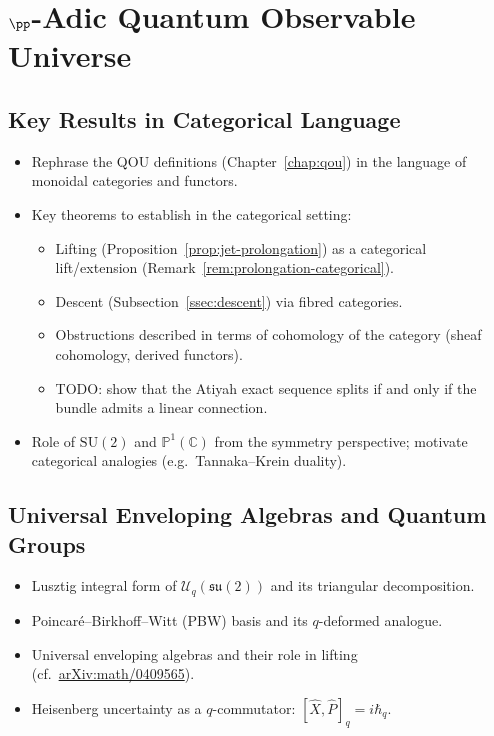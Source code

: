 \chapter{\texorpdfstring{$\pp$}{p}-Adic Quantum Observable Universe}
\label{chap:p-adic}


\section{Key Results in Categorical Language}
\label{sec:categorical-reformulation}

\begin{itemize}
  \item Rephrase the QOU definitions
        (Chapter~\ref{chap:qou}) in the language of monoidal categories
        and functors.
  \item Key theorems to establish in the categorical setting:
    \begin{itemize}
      \item Lifting (Proposition~\ref{prop:jet-prolongation}) as a
            categorical lift/extension
            (Remark~\ref{rem:prolongation-categorical}).
      \item Descent (Subsection~\ref{ssec:descent}) via fibred categories.
      \item Obstructions described in terms of cohomology of the category
            (sheaf cohomology, derived functors).
      \item TODO: show that the Atiyah exact sequence splits if and only
            if the bundle admits a linear connection.
    \end{itemize}
  \item Role of $\mathrm{SU}(2)$ and $\mathbb{P}^1(\mathbb{C})$ from the symmetry
        perspective; motivate categorical analogies
        (e.g.\ Tannaka--Krein duality).
\end{itemize}


\section{Universal Enveloping Algebras and Quantum Groups}
\label{sec:enveloping-algebras}

\begin{itemize}
  \item Lusztig integral form of
        $\mathcal{U}_q(\mathfrak{su}(2))$ and its triangular decomposition.
  \item Poincar\'{e}--Birkhoff--Witt (PBW) basis and its
        $q$-deformed analogue.
  \item Universal enveloping algebras and their role in lifting
        (cf.\ \href{https://arxiv.org/abs/math/0409565}{arXiv:math/0409565}).
  \item Heisenberg uncertainty as a $q$-commutator:
        $[\hat{X},\hat{P}]_q = i\hbar_q$.
\end{itemize}

